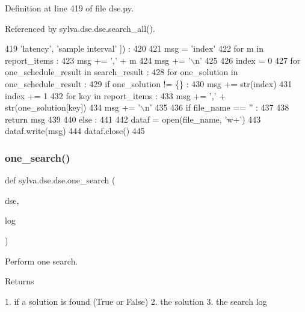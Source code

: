 Definition at line 419 of file dse.\+py.



Referenced by sylva.\+dse.\+dse.\+search\+\_\+all().


\begin{DoxyCode}
419                    \textcolor{stringliteral}{'latency'}, \textcolor{stringliteral}{'sample interval'} ]) :
420 
421   msg = \textcolor{stringliteral}{'index'}
422   \textcolor{keywordflow}{for} m \textcolor{keywordflow}{in} report\_items :
423     msg += \textcolor{stringliteral}{','} + m
424   msg += \textcolor{stringliteral}{'\(\backslash\)n'}
425 
426   index = 0
427   \textcolor{keywordflow}{for} one\_schedule\_result \textcolor{keywordflow}{in} search\_result :
428     \textcolor{keywordflow}{for} one\_solution \textcolor{keywordflow}{in} one\_schedule\_result :
429       \textcolor{keywordflow}{if} one\_solution != \{\} :
430         msg += str(index)
431         index += 1
432         \textcolor{keywordflow}{for} key \textcolor{keywordflow}{in} report\_items :
433           msg += \textcolor{stringliteral}{','} + str(one\_solution[key])
434         msg += \textcolor{stringliteral}{'\(\backslash\)n'}
435 
436   \textcolor{keywordflow}{if} file\_name == \textcolor{stringliteral}{''} :
437 
438     \textcolor{keywordflow}{return} msg
439 
440   \textcolor{keywordflow}{else} :
441 
442     dataf = open(file\_name, \textcolor{stringliteral}{'w+'})
443     dataf.write(msg)
444     dataf.close()
445 \end{DoxyCode}
\mbox{\label{namespacesylva_1_1dse_1_1dse_a27653b05dda8ab9dab8aa948db5b860a}} 
\subsubsection{\texorpdfstring{one\+\_\+search()}{one\_search()}}
{\footnotesize\ttfamily def sylva.\+dse.\+dse.\+one\+\_\+search (\begin{DoxyParamCaption}\item[{}]{dse,  }\item[{}]{log }\end{DoxyParamCaption})}

\begin{DoxyVerb}Perform one search.

Returns

1. if a solution is found (True or False)
2. the solution
3. the search log
\end{DoxyVerb}
 

